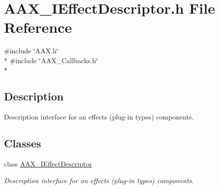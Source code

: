 \hypertarget{a00244}{}\section{A\+A\+X\+\_\+\+I\+Effect\+Descriptor.\+h File Reference}
\label{a00244}
{\ttfamily \#include \char`\"{}A\+A\+X.\+h\char`\"{}}\\*
{\ttfamily \#include \char`\"{}A\+A\+X\+\_\+\+Callbacks.\+h\char`\"{}}\\*


\subsection{Description}
Description interface for an effect\textquotesingle{}s (plug-\/in type\textquotesingle{}s) components. 

\subsection*{Classes}
\begin{DoxyCompactItemize}
\item 
class \hyperlink{a00096}{A\+A\+X\+\_\+\+I\+Effect\+Descriptor}
\begin{DoxyCompactList}\small\item\em Description interface for an effect\textquotesingle{}s (plug-\/in type\textquotesingle{}s) components. \end{DoxyCompactList}\end{DoxyCompactItemize}
